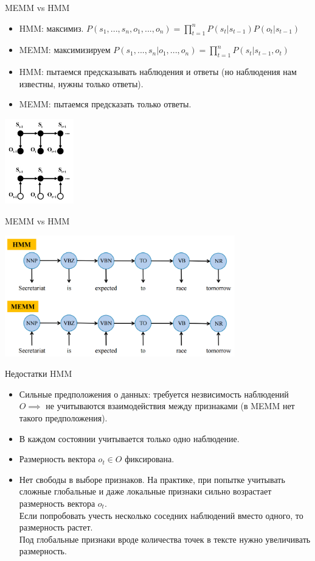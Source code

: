 \documentclass{beamer}
\begin{document}
\begin{frame}{MEMM vs HMM}
\begin{itemize}
\item HMM: максимиз. $P(s_1,...,s_n,o_1,...,o_n)=\prod_{t=1}^{n} P(s_t | s_{t-1}) P(o_t|s_{t-1})$
\item MEMM: максимизируем $P(s_1,...,s_n|o_1,...,o_n) = \prod_{t=1}^{n} P(s_t | s_{t-1}, o_t)$
\item HMM: пытаемся предсказывать наблюдения и ответы (но наблюдения нам известны, нужны только ответы).
\item MEMM: пытаемся предсказать только ответы.
\end{itemize}
\centerline{\includegraphics[width=3cm]{fig/hmmmemm.png}}
\end{frame}

\begin{frame}{MEMM vs HMM}
\centerline{\includegraphics[width=10cm]{fig/hmmmemm1.png}}
\end{frame}

\begin{frame}{Недостатки HMM}
\begin{itemize}
\item Сильные предположения о данных: требуется незвисимость наблюдений $O\implies$ не учитываются взаимодействия между признаками (в MEMM нет такого предположения).
\item В каждом состоянии учитывается только одно наблюдение.
\item Размерность вектора $o_t \in O$ фиксирована.
\item Нет свободы в выборе признаков. На практике, при попытке учитывать сложные глобальные и даже локальные признаки сильно возрастает размерность вектора $o_t$.\\
Если попробовать учесть несколько соседних наблюдений вместо одного, то размерность растет.\\
Под глобальные признаки вроде количества точек в тексте нужно увеличивать размерность.
\end{itemize}
\end{frame}
\end{document}
